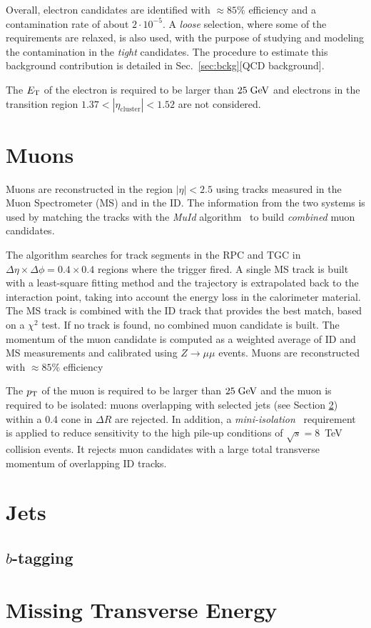 Overall, electron candidates are identified with \mbox{$\approx{}85\%$} 
efficiency and a contamination rate of about \mbox{$2\cdot{}10^{-5}$}.
A {\it loose} selection, where some of the requirements are relaxed, 
is also used, with the purpose of studying and modeling the contamination
in the {\it tight} candidates. The procedure to estimate this background
contribution is detailed in Sec.~\ref{sec:bckg}[QCD background].

The $\mbox{\ensuremath{E_{\mathrm{T}}}}$ of the electron is required to be larger than \mbox{$25 \; \mathrm{GeV}{}$}
and electrons in the transition region $1.37<|\eta_{\mathrm{cluster}}|<1.52$
are not considered.

\section{Muons}
\label{sec:muons}

Muons are reconstructed in the region $|\eta|<2.5$ using tracks measured in the 
Muon Spectrometer (MS) and in the ID.
The information from the two systems is used by matching
the tracks with the {\it MuId} algorithm~\cite{muidalgo} to build 
{\it combined} muon candidates.

The algorithm searches for track segments in the RPC and TGC in
$\Delta\eta\times\Delta\phi=0.4\times0.4$ regions where the trigger
fired. A single MS track is built with a least-square fitting method and
the trajectory is extrapolated back to the interaction point, taking
into account the energy loss in the calorimeter material. 
The MS track is combined with the ID track that provides the best
match, based on a $\chi^2$ test. If no track is found, no combined
muon candidate is built.
The momentum of the muon candidate is computed as a weighted average
of ID and MS measurements and calibrated using $Z\to \mu\mu$ events.
Muons are reconstructed with \mbox{$\approx{}85\%$} efficiency

The $p_{\mathrm{T}}$ of the muon is required to be larger than \mbox{$25 \; \mathrm{GeV}{}$}
and the muon is required to be isolated: muons overlapping with selected
jets (see Section \ref{sec:jets}) within a 0.4 cone in $\Delta R$ are
rejected. In addition, a {\it mini-isolation}~\cite{miniisolation}
requirement is applied to reduce sensitivity to the high pile-up
conditions of $\sqrt{s} = $8~TeV collision events. It rejects muon candidates
with a large total transverse momentum of overlapping ID tracks.

\section{Jets}
\label{sec:jets}



\subsection{$b$-tagging}
\label{sec:btag}

\section{Missing Transverse Energy}
\label{sec:met}
